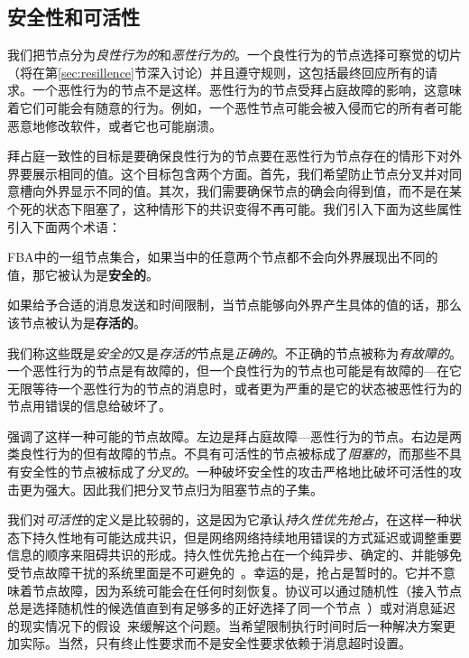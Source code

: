 \subsection{安全性和可活性}

我们把节点分为\textit{良性行为的}和\textit{恶性行为的}。一个良性行为的节点选择可察觉的{\quorum}切片（将在第\ref{sec:resillence}节深入讨论）并且遵守规则，这包括最终回应所有的请求。一个恶性行为的节点不是这样。恶性行为的节点受拜占庭故障的影响，这意味着它们可能会有随意的行为。例如，一个恶性节点可能会被入侵而它的所有者可能恶意地修改软件，或者它也可能崩溃。

拜占庭一致性的目标是要确保良性行为的节点要在恶性行为节点存在的情形下对外界要展示相同的值。这个目标包含两个方面。首先，我们希望防止节点分叉并对同意槽向外界显示不同的值。其次，我们需要确保节点的确会向得到值，而不是在某个死的状态下阻塞了，这种情形下的共识变得不再可能。我们引入下面为这些属性引入下面两个术语：

\begin{definition}[安全性]
	FBA中的一组节点集合，如果当中的任意两个节点都不会向外界展现出不同的值，那它被认为是{\textbf{安全的}}。
\end{definition}

\begin{definition}[可活性]
	如果给予合适的消息发送和时间限制，当节点能够向外界产生具体的值的话，那么该节点被认为是{\textbf{存活的}}。
\end{definition}

我们称这些既是\textit{安全的}又是\textit{存活的}节点是\textit{正确的}。不正确的节点被称为{\textit{有故障的}}。一个恶性行为的节点是有故障的，但一个良性行为的节点也可能是有故障的---在它无限等待一个恶性行为的节点的消息时，或者更为严重的是它的状态被恶性行为的节点用错误的信息给破坏了。

强调了这样一种可能的节点故障。左边是拜占庭故障---恶性行为的节点。右边是两类良性行为的但有故障的节点。不具有可活性的节点被标成了\textit{阻塞的}，而那些不具有安全性的节点被标成了\textit{分叉的}。一种破坏安全性的攻击严格地比破坏可活性的攻击更为强大。因此我们把分叉节点归为阻塞节点的子集。

我们对\textit{可活性}的定义是比较弱的，这是因为它承认\textit{持久性优先抢占}，在这样一种状态下持久性地有可能达成共识，但是网络网络持续地用错误的方式延迟或调整重要信息的顺序来阻碍共识的形成。持久性优先抢占在一个纯异步、确定的、并能够免受节点故障干扰的系统里面是不可避免的~\cite{Fischer:1985}。幸运的是，抢占是暂时的。它并不意味着节点故障，因为系统可能会在任何时刻恢复。协议可以通过随机性（接入节点总是选择随机性的候选值直到有足够多的正好选择了同一个节点~\cite{Ben-Or:1983:AFC:800221.806707,Bracha:1985:ACB:4221.214134}）或对消息延迟的现实情况下的假设~\cite{Dwork:1988:CPP:42282.42283}来缓解这个问题。当希望限制执行时间时后一种解决方案更加实际。当然，只有终止性要求而不是安全性要求依赖于消息超时设置。


